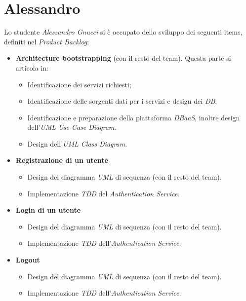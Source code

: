 \section{Alessandro}
Lo studente \textit{Alessandro Gnucci} si è occupato dello sviluppo dei seguenti items, definiti nel \textit{Product Backlog}:
\begin{itemize}
    \item \textbf{Architecture bootstrapping} (con il resto del team). Questa parte si articola in:
    \begin{itemize}
        \item Identificazione dei servizi richiesti;
        \item Identificazione delle sorgenti dati per i servizi e design dei \textit{DB};
        \item Identificazione e preparazione della piattaforma \textit{DBaaS}, inoltre design dell'\textit{UML Use Case Diagram}.
        \item  Design dell'\textit{UML Class Diagram}.
    \end{itemize}
    
    \item \textbf{Registrazione di un utente}
        \begin{itemize}
            \item Design del diagramma \textit{UML} di sequenza (con il resto del team).
            \item Implementazione \textit{TDD} del \textit{Authentication Service}.
        \end{itemize}
    
    \item \textbf{Login di un utente}
        \begin{itemize}
            \item Design del diagramma \textit{UML} di sequenza (con il resto del team).
            \item Implementazione \textit{TDD} dell'\textit{Authentication Service}.
        \end{itemize}
        
    \item \textbf{Logout}
    \begin{itemize}
        \item Design del diagramma \textit{UML} di sequenza (con il resto del team).
        \item Implementazione \textit{TDD} dell'\textit{Authentication Service}.
    \end{itemize}
    

\end{itemize}
